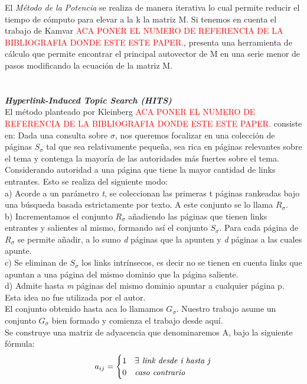 \documentclass[a4paper]{article}
\begin{document}
\indent El\emph{ M\'etodo de la Potencia} se realiza de manera iterativa lo cual permite reducir el tiempo de c\'omputo para elevar a la k la matriz M. Si tenemos en cuenta el trabajo de Kamvar \textcolor{red}{ACA PONER EL NUMERO DE REFERENCIA DE LA BIBLIOGRAFIA DONDE ESTE ESTE PAPER.}, presenta una herramienta de c\'alculo que permite encontrar el principal autovector de M en una serie menor de pasos modificando la ecuaci\'on de la matriz M.\\
\\
\\
\indent \indent \emph{\textbf{Hyperlink-Induced Topic Search (HITS)}} \\
\indent El m\'etodo planteado por Kleinberg \textcolor{red}{ACA PONER EL NUMERO DE REFERENCIA DE LA BIBLIOGRAFIA DONDE ESTE ESTE PAPER.} consiste en: Dada una consulta sobre $\sigma$, nos queremos focalizar en una colecci\'on de p\'aginas $S_\sigma$ tal que sea relativamente peque\~na, sea rica en p\'aginas relevantes sobre el tema y contenga la mayor\'ia de las autoridades m\'as fuertes sobre el tema. Considerando autoridad a una p\'agina que tiene la mayor cantidad de links entrantes. Esto se realiza del siguiente modo:\\
a) Acorde a un par\'ametro \emph{t}, se coleccionan las primeras t p\'aginas rankeadas bajo una b\'usqueda basada estrictamente por texto. A este conjunto se lo llama $R_\sigma$. \\
b) Incrementamos el conjunto $R_\sigma$ a\~nadiendo las p\'aginas que tienen links entrantes y salientes al mismo, formando as\'i el conjunto $S_\sigma$. Para cada p\'agina de $R_\sigma$ se permite a\~nadir, a lo sumo \emph{d} p\'aginas que la apunten y \emph{d} p\'aginas a las cuales apunte. \\
c) Se eliminan de $S_\sigma$ los links intr\'insecos, es decir no se tienen en cuenta links que apuntan a una p\'agina del mismo dominio que la p\'agina saliente. \\
d) Admite hasta \emph{m} p\'aginas del mismo dominio apuntar a cualquier p\'agina p. Esta idea no fue utilizada por el autor. \\
\indent El conjunto obtenido hasta aca lo llamamos $G_\sigma$. Nuestro trabajo asume un conjunto $G_\sigma$ bien formado y comienza el trabajo desde aqu\'i.\\
\indent Se construye una matriz de adyacencia que denominaremos A, bajo la siguiente f\'ormula:
\[
   a_{ij} = 
   \begin{cases} 
      1              & \exists$\textit{ link desde i hasta j}$   \\
      0 & $\textit{caso contrario}$
   \end{cases}
\]
\end{document}

